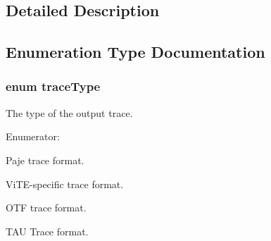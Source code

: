 \subsection{Detailed Description}


\subsection{Enumeration Type Documentation}
\hypertarget{group__traceType_gabfcf61a4d79aa427ef510070fce86311}{
\subsubsection[{trace\-Type}]{\setlength{\rightskip}{0pt plus 5cm}enum {\bf trace\-Type}}}\label{group__traceType_gabfcf61a4d79aa427ef510070fce86311}


The type of the output trace. 

\begin{Desc}
\item[Enumerator\-: ]\par
\begin{description}
\item[{\em 
\hypertarget{group__traceType_gabfcf61a4d79aa427ef510070fce86311a464fcf408aa7f29de9e7828dfbc39147}{P\-A\-J\-E}\label{group__traceType_gabfcf61a4d79aa427ef510070fce86311a464fcf408aa7f29de9e7828dfbc39147}
}]Paje trace format. \item[{\em 
\hypertarget{group__traceType_gabfcf61a4d79aa427ef510070fce86311aac864727fa7382dc8f3414f1667a78b5}{V\-I\-T\-E}\label{group__traceType_gabfcf61a4d79aa427ef510070fce86311aac864727fa7382dc8f3414f1667a78b5}
}]Vi\-T\-E-\/specific trace format. \item[{\em 
\hypertarget{group__traceType_gabfcf61a4d79aa427ef510070fce86311a836fd85172c09b9aebf8e9712b9aae73}{O\-T\-F}\label{group__traceType_gabfcf61a4d79aa427ef510070fce86311a836fd85172c09b9aebf8e9712b9aae73}
}]O\-T\-F trace format. \item[{\em 
\hypertarget{group__traceType_gabfcf61a4d79aa427ef510070fce86311a4b124dad7992814397ae48d321af66b5}{T\-A\-U}\label{group__traceType_gabfcf61a4d79aa427ef510070fce86311a4b124dad7992814397ae48d321af66b5}
}]T\-A\-U Trace format. \end{description}
\end{Desc}



